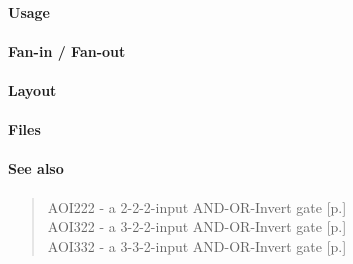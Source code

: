 \paragraph{Usage}

\paragraph{Fan-in / Fan-out}

\paragraph{Layout}

\paragraph{Files}

\paragraph{See also}
\begin{quote}
    AOI222 - a 2-2-2-input AND-OR-Invert gate [p.\pageref{AOI222}] \\
    AOI322 - a 3-2-2-input AND-OR-Invert gate [p.\pageref{AOI322}] \\
    AOI332 - a 3-3-2-input AND-OR-Invert gate [p.\pageref{AOI332}]
\end{quote}
